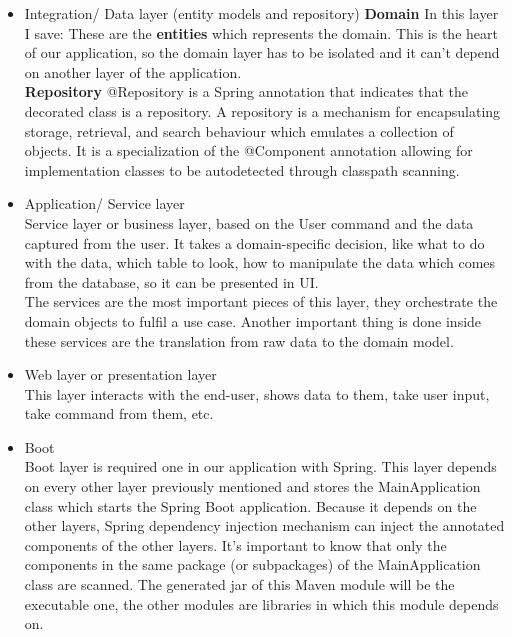 \documentclass{scrartcl}
\begin{document}
\begin{itemize}
\item Integration/ Data layer (entity models and repository)
\textbf{Domain}
In this layer I save:
These are the \textbf{entities} which represents the domain. This is the heart of our application, so the domain layer has to be isolated and it can't depend on another layer of the application.\\
\textbf{Repository}
@Repository is a Spring annotation that indicates that the decorated class is a repository. A repository is a mechanism for encapsulating storage, retrieval, and search behaviour which emulates a collection of objects. It is a specialization of the @Component annotation allowing for implementation classes to be autodetected through classpath scanning.	
	
\item	Application/ Service layer \\
Service layer or business layer, based on the User command and the data captured from the user. It takes a domain-specific decision, like what to do with the data, which table to look, how to manipulate the data which comes from the database, so it can be presented in UI.\\
The services are the most important pieces of this layer, they orchestrate the domain objects to fulfil a use case. Another important thing is done inside these services are the translation from raw data to the domain model.\\
\item  Web layer or presentation layer\\
This layer interacts with the end-user, shows data to them, take user input, take command from them, etc.

\item Boot \\
Boot layer is required one in our application with Spring. This layer depends on every other layer previously mentioned and stores the MainApplication class which starts the Spring Boot application. Because it depends on the other layers, Spring dependency injection mechanism can inject the annotated components of the other layers. It’s important to know that only the components in the same package (or subpackages) of the MainApplication class are scanned. The generated jar of this Maven module will be the executable one, the other modules are libraries in which this module depends on.\\


\end{itemize}
\end{document}
